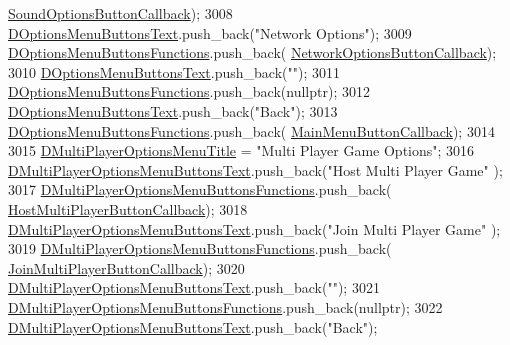 \begin{DoxyCode}
      \hyperlink{classCApplicationData_a7169395ea835eaa9c98188d1b3583534}{SoundOptionsButtonCallback});
3008     \hyperlink{classCApplicationData_aa9201da5408887973cb56fb1671ad6f8}{DOptionsMenuButtonsText}.push\_back(\textcolor{stringliteral}{"Network Options"});
3009     \hyperlink{classCApplicationData_a4c9516d20be17a9c9d5c1119736037e5}{DOptionsMenuButtonsFunctions}.push\_back(
      \hyperlink{classCApplicationData_ad41dbc2f54ee638aa64a1d0c22b3fba9}{NetworkOptionsButtonCallback});
3010     \hyperlink{classCApplicationData_aa9201da5408887973cb56fb1671ad6f8}{DOptionsMenuButtonsText}.push\_back(\textcolor{stringliteral}{""});
3011     \hyperlink{classCApplicationData_a4c9516d20be17a9c9d5c1119736037e5}{DOptionsMenuButtonsFunctions}.push\_back(\textcolor{keyword}{nullptr});
3012     \hyperlink{classCApplicationData_aa9201da5408887973cb56fb1671ad6f8}{DOptionsMenuButtonsText}.push\_back(\textcolor{stringliteral}{"Back"});
3013     \hyperlink{classCApplicationData_a4c9516d20be17a9c9d5c1119736037e5}{DOptionsMenuButtonsFunctions}.push\_back(
      \hyperlink{classCApplicationData_a4410839118b5b74dab798ad7be6f703b}{MainMenuButtonCallback});
3014     
3015     \hyperlink{classCApplicationData_aa9c4883274c2313743a42b68c7fc427f}{DMultiPlayerOptionsMenuTitle} = \textcolor{stringliteral}{"Multi Player Game Options"};
3016     \hyperlink{classCApplicationData_a400aa1df18482fe5d9f34e861a0dc257}{DMultiPlayerOptionsMenuButtonsText}.push\_back(\textcolor{stringliteral}{"Host Multi Player Game"}
      );
3017     \hyperlink{classCApplicationData_ad32d3cc90fd1ead1574cb6c336257e1c}{DMultiPlayerOptionsMenuButtonsFunctions}.push\_back(
      \hyperlink{classCApplicationData_a9f804f7f34e1f0abf8c395cd0032d811}{HostMultiPlayerButtonCallback});
3018     \hyperlink{classCApplicationData_a400aa1df18482fe5d9f34e861a0dc257}{DMultiPlayerOptionsMenuButtonsText}.push\_back(\textcolor{stringliteral}{"Join Multi Player Game"}
      );
3019     \hyperlink{classCApplicationData_ad32d3cc90fd1ead1574cb6c336257e1c}{DMultiPlayerOptionsMenuButtonsFunctions}.push\_back(
      \hyperlink{classCApplicationData_a4fa8cf7a67c0ae980d38e1fe7b967f41}{JoinMultiPlayerButtonCallback});
3020     \hyperlink{classCApplicationData_a400aa1df18482fe5d9f34e861a0dc257}{DMultiPlayerOptionsMenuButtonsText}.push\_back(\textcolor{stringliteral}{""});
3021     \hyperlink{classCApplicationData_ad32d3cc90fd1ead1574cb6c336257e1c}{DMultiPlayerOptionsMenuButtonsFunctions}.push\_back(\textcolor{keyword}{nullptr});
3022     \hyperlink{classCApplicationData_a400aa1df18482fe5d9f34e861a0dc257}{DMultiPlayerOptionsMenuButtonsText}.push\_back(\textcolor{stringliteral}{"Back"});

\end{DoxyCode}
